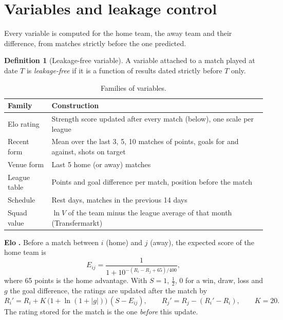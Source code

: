 \documentclass[11pt,a4paper]{article}
\theoremstyle{definition}
\newtheorem{definition}{Definition}[section]
\theoremstyle{remark}
\begin{document}
\section{Variables and leakage control}

Every variable is computed for the home team, the away team and their difference, from matches strictly before the one predicted.

\begin{definition}[Leakage-free variable]
A variable attached to a match played at date $T$ is \emph{leakage-free} if it is a function of results dated strictly before $T$ only.
\end{definition}

\begin{table}[H]
\caption{Families of variables.}
\begin{center}
\small
\begin{tabular}{p{3.0cm}p{9.5cm}}
\toprule
\textbf{Family} & \textbf{Construction} \\
\midrule
Elo rating & Strength score updated after every match (below), one scale per league \\
Recent form & Mean over the last 3, 5, 10 matches of points, goals for and against, shots on target \\
Venue form & Last 5 home (or away) matches \\
League table & Points and goal difference per match, position before the match \\
Schedule & Rest days, matches in the previous 14 days \\
Squad value & $\ln V$ of the team minus the league average of that month (Transfermarkt) \\
\bottomrule
\end{tabular}
\end{center}
\end{table}

\textbf{Elo} \cite{elo1978}\textbf{.} Before a match between $i$ (home) and $j$ (away), the expected score of the home team is
\begin{equation}E_{ij}=\frac{1}{1+10^{-(R_i-R_j+65)/400}},\end{equation}
where 65 points is the home advantage. With $S=1$, $\tfrac12$, $0$ for a win, draw, loss and $g$ the goal difference, the ratings are updated after the match by
\begin{equation}R_i' = R_i + K\,\bigl(1+\ln(1+|g|)\bigr)\,(S-E_{ij}),\qquad R_j' = R_j - (R_i'-R_i),\qquad K=20.\end{equation}
The rating stored for the match is the one \emph{before} this update.
\end{document}

